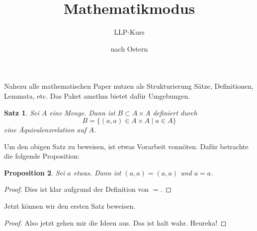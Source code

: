\documentclass{scrartcl}
\title{Mathematikmodus}
\author{LLP-Kurs}
\date{nach Ostern}
\newtheorem{theorem}     {Satz} [section]
\newtheorem{proposition} [theorem] {Proposition}
\begin{document}
\maketitle
  Nahezu alle mathematischen Paper nutzen als Strukturierung Sätze, Definitionen, Lemmata, etc. Das Paket amsthm bietet dafür Umgebungen.
  \begin{theorem}
    Sei $A$ eine Menge. Dann ist $B \subset A \times A$ definiert durch
    \begin{equation*}
      B = \{(a,a) \in A \times A \mid a \in A\}
    \end{equation*}
    eine \emph{Äquivalenzrelation} auf $A$.
  \end{theorem}

  Um den obigen Satz zu beweisen, ist etwas Vorarbeit vonnöten. Dafür betrachte die folgende Proposition:
  \begin{proposition}
    Sei $a$ etwas. Dann ist $(a,a) = (a,a)$ und $a = a$.
  \end{proposition}
  \begin{proof}
    Dies ist klar aufgrund der Definition von $=$.
  \end{proof}

  Jetzt können wir den ersten Satz beweisen.
  \begin{proof}
    Also jetzt gehen mir die Ideen aus. Das ist halt wahr. Heureka!
  \end{proof}
\end{document}
